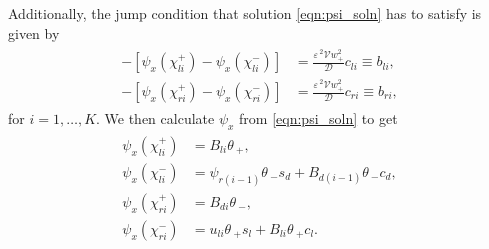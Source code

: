 \documentclass[a4paper,10pt]{article}
\newcommand{\tH}{\ensuremath{\theta\,}}
\newcommand{\Ep}{\ensuremath{\varepsilon\,}}
\newcommand{\DD}{\ensuremath{\mathcal{D}}}
\newcommand{\VV}{\ensuremath{\mathcal{V}}}
\begin{document}
Additionally, the jump condition that solution \eqref{eqn:psi_soln} has to satisfy is given by
% 
\begin{equation}
\label{eqn:jump_cond}
\begin{split}
\begin{aligned}
  -[\psi_x(\chi_{li}^+) - \psi_x(\chi_{li}^-)] &= \frac{\Ep^2\VV w_+^2}{\DD}c_{li} \equiv b_{li},\\
  -[\psi_x(\chi_{ri}^+) - \psi_x(\chi_{ri}^-)] &= \frac{\Ep^2\VV w_+^2}{\DD}c_{ri} \equiv b_{ri},
\end{aligned}
\end{split}
\end{equation}
% 
for $i=1,\ldots,K$. We then calculate $\psi_x$ from \eqref{eqn:psi_soln} to get
% 
\begin{equation}
\label{eqn:psi_eval}
\begin{split}
\begin{aligned}
  \psi_x(\chi_{li}^+) &= B_{li}\tH_+,\\
  \psi_x(\chi_{li}^-) &= \psi_{r(i-1)}\tH_-s_d + B_{d(i-1)}\tH_-c_d,\\
  \psi_x(\chi_{ri}^+) &= B_{di}\tH_-,\\
  \psi_x(\chi_{ri}^-) &= u_{li}\tH_+s_l + B_{li}\tH_+c_l.
\end{aligned}
\end{split}
\end{equation}
% 
\end{document}
